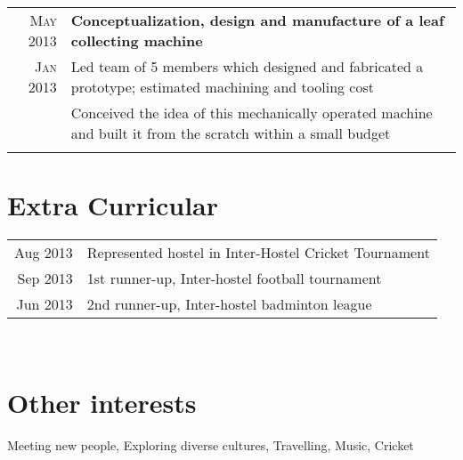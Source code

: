 \documentclass[a4paper,10pt]{article}
\begin{document}
\begin{tabular}{r|p{18cm}}
\textsc{May 2013} & \textbf{Conceptualization, design and manufacture of a leaf collecting machine}\\
\textsc{Jan 2013} & Led team of 5 members which designed and fabricated a prototype; estimated machining and tooling cost\\
& Conceived the idea of this mechanically operated machine and built it from the scratch within a small budget\\\multicolumn{2}{c}{}

\end{tabular}

\section{Extra Curricular}
\begin{tabular}{r|p{18cm}}

Aug 2013 & Represented hostel in Inter-Hostel Cricket Tournament\\
Sep 2013 & 1st runner-up, Inter-hostel football tournament\\
Jun 2013 & 2nd runner-up, Inter-hostel badminton league\\

\end{tabular}\\

\section{Other interests}
\begin{flushleft}
Meeting new people, Exploring diverse cultures, Travelling, Music, Cricket
\end{flushleft}
\end{document}
